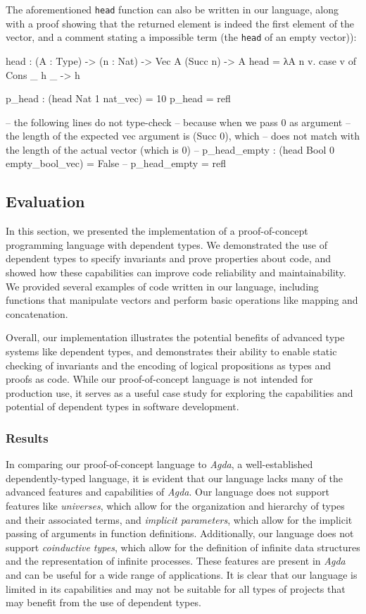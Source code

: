 \documentclass[12pt]{article}
\theoremstyle{definition}
\newcommand{\code}[1]{\texttt{#1}}
\begin{document}
The aforementioned \code{head} function can also be written in our language, along with a proof showing that the returned element is indeed the first element of the vector, and a comment stating a impossible term (the \code{head} of an empty vector)): 
\begin{piforall}
head : (A : Type) -> (n : Nat) -> Vec A (Succ n) -> A
head = λA n v. case v of {
  Cons _ h _ -> h
}

p_head : (head Nat 1 nat_vec) = 10
p_head = refl

-- the following lines do not type-check
-- because when we pass 0 as argument
-- the length of the expected vec argument is (Succ 0), which
-- does not match with the length of the actual vector (which is 0)
-- p_head_empty : (head Bool 0 empty_bool_vec) = False
-- p_head_empty = refl
\end{piforall}

\subsection{Evaluation}

In this section, we presented the implementation of a proof-of-concept programming language with dependent types. We demonstrated the use of dependent types to specify invariants and prove properties about code, and showed how these capabilities can improve code reliability and maintainability. We provided several examples of code written in our language, including functions that manipulate vectors and perform basic operations like mapping and concatenation.

Overall, our implementation illustrates the potential benefits of advanced type systems like dependent types, and demonstrates their ability to enable static checking of invariants and the encoding of logical propositions as types and proofs as code. While our proof-of-concept language is not intended for production use, it serves as a useful case study for exploring the capabilities and potential of dependent types in software development.

\subsubsection{Results}

In comparing our proof-of-concept language to \emph{Agda}, a well-established dependently-typed language, it is evident that our language lacks many of the advanced features and capabilities of \emph{Agda}. Our language does not support features like \emph{universes}, which allow for the organization and hierarchy of types and their associated terms, and \emph{implicit parameters}, which allow for the implicit passing of arguments in function definitions. Additionally, our language does not support \emph{coinductive types}, which allow for the definition of infinite data structures and the representation of infinite processes. These features are present in \emph{Agda} and can be useful for a wide range of applications. It is clear that our language is limited in its capabilities and may not be suitable for all types of projects that may benefit from the use of dependent types.
\end{document}
